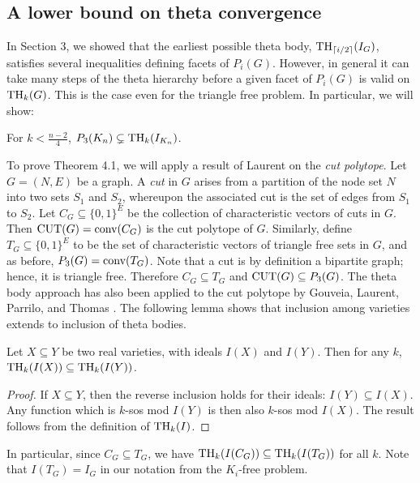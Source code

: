 \subsection{A lower bound on theta convergence}
In Section 3, we showed that the earliest possible theta body, $\textup{TH}_{\lceil i/2 \rceil}(I_G)$, satisfies several inequalities defining facets of $P_i(G)$. However, in general it can take many steps of the theta hierarchy before a given facet of $P_i(G)$ is valid on $\textup{TH}_k(G)$. This is the case even for the triangle free problem. In particular, we will show:
\begin{theorem}\label{trianglecut}
For $k < \frac{n-2}{4}$, $P_3(K_n) \subsetneq \textup{TH}_{k}(I_{K_n})$.
\end{theorem}

To prove Theorem 4.1, we will apply a result of Laurent \cite{moniquestuff} on
the {\em cut polytope}. Let $G=(N,E)$ be a graph. A {\em cut} in $G$ arises from
a partition of the node set $N$ into two sets $S_1$ and $S_2$, whereupon the
associated cut is the set of edges from $S_1$ to $S_2$. Let $C_G \subseteq
\{0,1\}^E$ be the collection of characteristic vectors of cuts in $G$. Then
$\textup{CUT}(G) = \textup{conv}(C_G)$ is the cut polytope of $G$. Similarly,
define $T_G \subseteq \{0,1\}^E$ to be the set of characteristic vectors of
triangle free sets in $G$, and as before, $P_3(G) = \textup{conv}(T_G)$. Note
that a cut is by definition a bipartite graph; hence, it is triangle free. Therefore $C_G \subseteq T_G$ and $\textup{CUT}(G) \subseteq P_3(G)$. The theta body approach has also been applied to the cut polytope by Gouveia, Laurent, Parrilo, and Thomas \cite{GLPT}. The following lemma shows that inclusion among varieties extends to inclusion of theta bodies.

\begin{lemma}\label{ideal_inclusion}
Let $X \subseteq Y$ be two real varieties, with ideals $I(X)$ and $I(Y)$. Then for any $k$, $\textup{TH}_k(I(X)) \subseteq \textup{TH}_k(I(Y))$.
\end{lemma}
\begin{proof}
If $X \subseteq Y$, then the reverse inclusion holds for their ideals: $I(Y) \subseteq I(X)$. Any function which is $k$-sos mod $I(Y)$ is then also $k$-sos mod $I(X)$. The result follows from the definition of $\textup{TH}_k(I)$.
\end{proof}
In particular, since $C_G \subseteq T_G$, we have $\textup{TH}_k(I(C_G))
\subseteq \textup{TH}_k(I(T_G))$ for all $k$. Note that $I(T_G) = I_G$ in our
notation from the $K_i$-free problem.

